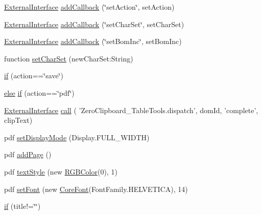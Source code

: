 \begin{DoxyCompactItemize}
\item 
\hyperlink{_zero_clipboard_pdf_8as_a8adbb9e92ce78f1cd583ebf4ff65e221}{External\+Interface} \hyperlink{class_zero_clipboard_a6dabca5a8d3ecb84361b8da8c6a48083}{add\+Callback} (\char`\"{}set\+Action\char`\"{}, set\+Action)
\item 
\hyperlink{_zero_clipboard_pdf_8as_a8adbb9e92ce78f1cd583ebf4ff65e221}{External\+Interface} \hyperlink{class_zero_clipboard_acf2cc4a8e5ffec84002ec21bc8c6e8a2}{add\+Callback} (\char`\"{}set\+Char\+Set\char`\"{}, set\+Char\+Set)
\item 
\hyperlink{_zero_clipboard_pdf_8as_a8adbb9e92ce78f1cd583ebf4ff65e221}{External\+Interface} \hyperlink{class_zero_clipboard_a35fad11a51480274821656e9aa99dffa}{add\+Callback} (\char`\"{}set\+Bom\+Inc\char`\"{}, set\+Bom\+Inc)
\item 
function \hyperlink{class_zero_clipboard_afff74945c875f8b8a2df04efa17d9a08}{set\+Char\+Set} (new\+Char\+Set\+:\+String)
\item 
\hyperlink{class_zero_clipboard_a09ea1ca3b5895c362c3b07f009c817dc}{if} (action==\char`\"{}save\char`\"{})
\item 
\hyperlink{class_zero_clipboard_a18ece373746e9446cf10bdcf1758648c}{else} \hyperlink{class_zero_clipboard_adfee737886dc7f0cb8ceca7b048d2b13}{if} (action==\char`\"{}pdf\char`\"{})
\item 
\hyperlink{_zero_clipboard_pdf_8as_a8adbb9e92ce78f1cd583ebf4ff65e221}{External\+Interface} \hyperlink{class_zero_clipboard_a25a9af57e0d29314de3e6f227fa0fbc6}{call} ( 'Zero\+Clipboard\+\_\+\+Table\+Tools.\+dispatch', dom\+Id, 'complete', clip\+Text)
\item 
pdf \hyperlink{class_zero_clipboard_a91f822743a75bce2bd559956b0f77c0a}{set\+Display\+Mode} (Display.\+F\+U\+L\+L\+\_\+\+W\+I\+D\+T\+H)
\item 
pdf \hyperlink{class_zero_clipboard_a4a9e0b9a8834125350199a361684e31e}{add\+Page} ()
\item 
pdf \hyperlink{class_zero_clipboard_a90d89a4b21093b2f9c20838a7fe50269}{text\+Style} (new \hyperlink{class_zero_clipboard_a08b586506c710efb4a2b5e74019a9808}{R\+G\+B\+Color}(0), 1)
\item 
pdf \hyperlink{class_zero_clipboard_afbb0836b287ade9b2b37d71507c8d686}{set\+Font} (new \hyperlink{_zero_clipboard_pdf_8as_a183616598243889d6077ab7f545062f7}{Core\+Font}(Font\+Family.\+H\+E\+L\+V\+E\+T\+I\+C\+A), 14)
\item 
\hyperlink{class_zero_clipboard_a02a42acce12f3616c46af68dc2f38af9}{if} (title!=\char`\"{}\char`\"{})

\end{DoxyCompactItemize}
